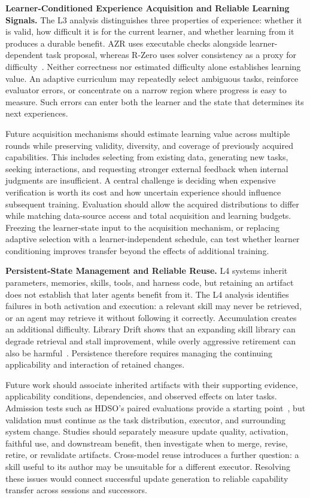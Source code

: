 \noindent\textbf{Learner-Conditioned Experience Acquisition and Reliable Learning Signals.}
The L3 analysis distinguishes three properties of experience: whether it is valid, how difficult it is for the current learner, and whether learning from it produces a durable benefit. AZR uses executable checks alongside learner-dependent task proposal, whereas R-Zero uses solver consistency as a proxy for difficulty~\cite{zhao2025absolutezero,huang2026rzero}. Neither correctness nor estimated difficulty alone establishes learning value. An adaptive curriculum may repeatedly select ambiguous tasks, reinforce evaluator errors, or concentrate on a narrow region where progress is easy to measure. Such errors can enter both the learner and the state that determines its next experiences.

Future acquisition mechanisms should estimate learning value across multiple rounds while preserving validity, diversity, and coverage of previously acquired capabilities. This includes selecting from existing data, generating new tasks, seeking interactions, and requesting stronger external feedback when internal judgments are insufficient. A central challenge is deciding when expensive verification is worth its cost and how uncertain experience should influence subsequent training. Evaluation should allow the acquired distributions to differ while matching data-source access and total acquisition and learning budgets. Freezing the learner-state input to the acquisition mechanism, or replacing adaptive selection with a learner-independent schedule, can test whether learner conditioning improves transfer beyond the effects of additional training.

\noindent\textbf{Persistent-State Management and Reliable Reuse.}
L4 systems inherit parameters, memories, skills, tools, and harness code, but retaining an artifact does not establish that later agents benefit from it. The L4 analysis identifies failures in both activation and execution: a relevant skill may never be retrieved, or an agent may retrieve it without following it correctly. Accumulation creates an additional difficulty. Library Drift shows that an expanding skill library can degrade retrieval and stall improvement, while overly aggressive retirement can also be harmful~\cite{zhang2026library}. Persistence therefore requires managing the continuing applicability and interaction of retained changes.

Future work should associate inherited artifacts with their supporting evidence, applicability conditions, dependencies, and observed effects on later tasks. Admission tests such as HDSO's paired evaluations provide a starting point~\cite{shang2026hypothesis}, but validation must continue as the task distribution, executor, and surrounding system change. Studies should separately measure update quality, activation, faithful use, and downstream benefit, then investigate when to merge, revise, retire, or revalidate artifacts. Cross-model reuse introduces a further question: a skill useful to its author may be unsuitable for a different executor. Resolving these issues would connect successful update generation to reliable capability transfer across sessions and successors.

